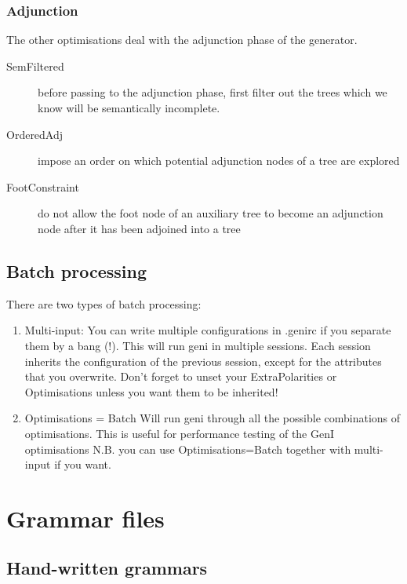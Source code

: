 \documentclass[11pt]{article}
\begin{document}
\subsubsection{Adjunction}

The other optimisations deal with the adjunction phase of the
generator.

\begin{description}
\item[SemFiltered] before passing to the adjunction phase,
                   first filter out the trees which we know
                   will be semantically incomplete.
\item[OrderedAdj] impose an order on which potential
                  adjunction nodes of a tree are explored
\item[FootConstraint] do not allow the foot node of an auxiliary tree to
                      become an adjunction node after it has been 
                      adjoined into a tree
\end{description}

\subsection{Batch processing}
There are two types of batch processing:
\begin{enumerate}
\item Multi-input:
      You can write multiple configurations in .genirc if you separate
      them by a bang (!).  This will run geni in multiple sessions.
      Each session inherits the configuration of the previous session,
      except for the attributes that you overwrite.  Don't forget to
      unset your ExtraPolarities or Optimisations unless you want them
      to be inherited!
\item Optimisations = Batch 
      Will run geni through all the possible combinations of
      optimisations.  This is useful for performance testing
      of the GenI optimisations
      N.B. you can use Optimisations=Batch together with multi-input
      if you want.
\end{enumerate}

\section{Grammar files}

\subsection{Hand-written grammars}
\end{document}
